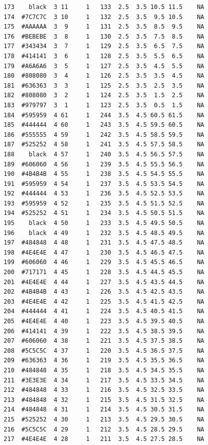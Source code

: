 \documentclass[12pt,twoside]{reedthesis}
\begin{document}
\begin{verbatim}
  173    black  3 11     1   133  2.5  3.5 10.5 11.5    NA
  174  #7C7C7C  3 10     1   132  2.5  3.5  9.5 10.5    NA
  175  #AAAAAA  3  9     1   131  2.5  3.5  8.5  9.5    NA
  176  #BEBEBE  3  8     1   130  2.5  3.5  7.5  8.5    NA
  177  #343434  3  7     1   129  2.5  3.5  6.5  7.5    NA
  178  #414141  3  6     1   128  2.5  3.5  5.5  6.5    NA
  179  #A6A6A6  3  5     1   127  2.5  3.5  4.5  5.5    NA
  180  #808080  3  4     1   126  2.5  3.5  3.5  4.5    NA
  181  #636363  3  3     1   125  2.5  3.5  2.5  3.5    NA
  182  #808080  3  2     1   124  2.5  3.5  1.5  2.5    NA
  183  #979797  3  1     1   123  2.5  3.5  0.5  1.5    NA
  184  #595959  4 61     1   244  3.5  4.5 60.5 61.5    NA
  185  #444444  4 60     1   243  3.5  4.5 59.5 60.5    NA
  186  #555555  4 59     1   242  3.5  4.5 58.5 59.5    NA
  187  #525252  4 58     1   241  3.5  4.5 57.5 58.5    NA
  188    black  4 57     1   240  3.5  4.5 56.5 57.5    NA
  189  #606060  4 56     1   239  3.5  4.5 55.5 56.5    NA
  190  #4B4B4B  4 55     1   238  3.5  4.5 54.5 55.5    NA
  191  #595959  4 54     1   237  3.5  4.5 53.5 54.5    NA
  192  #444444  4 53     1   236  3.5  4.5 52.5 53.5    NA
  193  #595959  4 52     1   235  3.5  4.5 51.5 52.5    NA
  194  #525252  4 51     1   234  3.5  4.5 50.5 51.5    NA
  195    black  4 50     1   233  3.5  4.5 49.5 50.5    NA
  196    black  4 49     1   232  3.5  4.5 48.5 49.5    NA
  197  #484848  4 48     1   231  3.5  4.5 47.5 48.5    NA
  198  #4E4E4E  4 47     1   230  3.5  4.5 46.5 47.5    NA
  199  #606060  4 46     1   229  3.5  4.5 45.5 46.5    NA
  200  #717171  4 45     1   228  3.5  4.5 44.5 45.5    NA
  201  #4E4E4E  4 44     1   227  3.5  4.5 43.5 44.5    NA
  202  #4B4B4B  4 43     1   226  3.5  4.5 42.5 43.5    NA
  203  #4E4E4E  4 42     1   225  3.5  4.5 41.5 42.5    NA
  204  #444444  4 41     1   224  3.5  4.5 40.5 41.5    NA
  205  #4E4E4E  4 40     1   223  3.5  4.5 39.5 40.5    NA
  206  #414141  4 39     1   222  3.5  4.5 38.5 39.5    NA
  207  #606060  4 38     1   221  3.5  4.5 37.5 38.5    NA
  208  #5C5C5C  4 37     1   220  3.5  4.5 36.5 37.5    NA
  209  #636363  4 36     1   219  3.5  4.5 35.5 36.5    NA
  210  #484848  4 35     1   218  3.5  4.5 34.5 35.5    NA
  211  #3E3E3E  4 34     1   217  3.5  4.5 33.5 34.5    NA
  212  #484848  4 33     1   216  3.5  4.5 32.5 33.5    NA
  213  #484848  4 32     1   215  3.5  4.5 31.5 32.5    NA
  214  #484848  4 31     1   214  3.5  4.5 30.5 31.5    NA
  215  #525252  4 30     1   213  3.5  4.5 29.5 30.5    NA
  216  #5C5C5C  4 29     1   212  3.5  4.5 28.5 29.5    NA
  217  #4E4E4E  4 28     1   211  3.5  4.5 27.5 28.5    NA

\end{verbatim}
\end{document}
